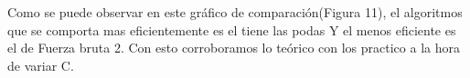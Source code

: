 Como se puede observar en este gráfico de comparación(Figura 11), el algoritmos que se comporta mas eficientemente es el tiene las podas Y el menos eficiente es el de Fuerza bruta 2. Con esto corroboramos lo teórico con los practico a la hora de variar C. 








